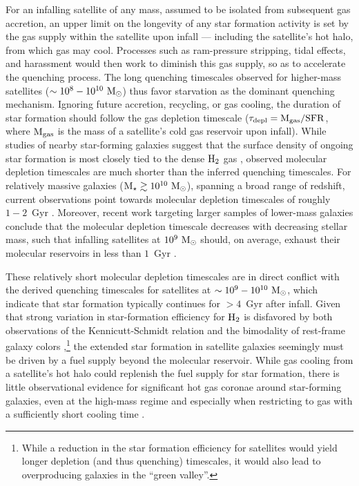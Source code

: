 \documentclass[usenatbib]{mn2e}
\newcommand{\mstar}{{\rm M}_{\star}}
\newcommand{\msun}{{\rm M}_{\odot}}
\begin{document}
For an infalling satellite of any mass, assumed to be isolated from
subsequent gas accretion, an upper limit on the longevity of any star
formation activity is set by the gas supply within the satellite upon
infall --- including the satellite's hot halo, from which gas may
cool. Processes such as ram-pressure stripping, tidal effects, and
harassment would then work to diminish this gas supply, so as to
accelerate the quenching process. The long quenching timescales
observed for higher-mass satellites ($\sim10^{8}-10^{10}~\msun$) thus
favor starvation as the dominant quenching mechanism. Ignoring future
accretion, recycling, or gas cooling, the duration of star formation
should follow the gas depletion timescale ($\tau_{\rm depl} = {\rm
  M}_{\rm gas} / {\rm SFR}$, where ${\rm M}_{\rm gas}$ is the mass of
a satellite's cold gas reservoir upon infall). While studies of nearby
star-forming galaxies suggest that the surface density of ongoing star
formation is most closely tied to the dense ${\rm H}_{2}$ gas
\citep{bigiel08, bigiel11, leroy08}, observed molecular depletion
timescales are much shorter than the inferred quenching
timescales. For relatively massive galaxies ($\mstar \gtrsim
10^{10}~\msun$), spanning a broad range of redshift, current
observations point towards molecular depletion timescales of roughly
$1-2$~Gyr \citep{bigiel11, leroy13, saintonge11, tacconi10, tacconi13,
  genzel10, genzel15}. Moreover, recent work targeting larger samples
of lower-mass galaxies conclude that the molecular depletion timescale
decreases with decreasing stellar mass, such that infalling satellites
at $10^{9}~\msun$ should, on average, exhaust their molecular
reservoirs in less than $1$~Gyr \citep{saintonge11, boselli14}.


These relatively short molecular depletion timescales are in direct
conflict with the derived quenching timescales for satellites at
$\sim10^{9}-10^{10}~\msun$, which indicate that star formation
typically continues for $>4$~Gyr after infall. Given that strong
variation in star-formation efficiency for ${\rm H}_{2}$ is disfavored
by both observations of the Kennicutt-Schmidt relation
\citep{bigiel08, leroy08, krumholz05} and the bimodality of rest-frame
galaxy colors \citep[or specific star formation rates,][]{balogh09,
  weinmann10},\footnote{While a reduction in the star formation
  efficiency for satellites would yield longer depletion (and thus
  quenching) timescales, it would also lead to overproducing galaxies
  in the ``green valley''.} the extended star formation in satellite
galaxies seemingly must be driven by a fuel supply beyond the
molecular reservoir. While gas cooling from a satellite's hot halo
could replenish the fuel supply for star formation, there is little
observational evidence for significant hot gas coronae around
star-forming galaxies, even at the high-mass regime and especially
when restricting to gas with a sufficiently short cooling time
\citep[][]{sun07, rasmussen09, crain10, miller15}.
\end{document}
